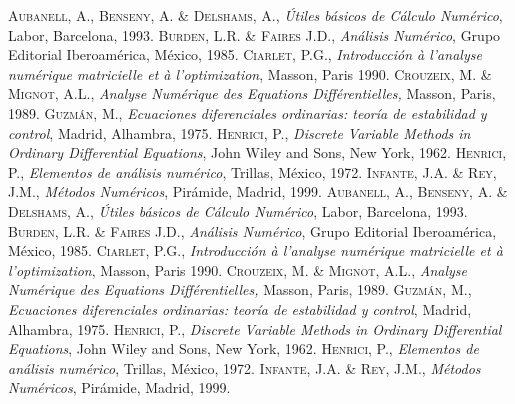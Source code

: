\documentclass[12pt,a4paper]{report}
\begin{document}
\begin{thebibliography}{9}
%
%
\textsc{Aubanell, A., Benseny, A. \& Delshams, A.,}
\textit{Útiles básicos de Cálculo Numérico}, Labor, Barcelona, 1993.
%
 \textsc{Burden, L.R. \& Faires J.D.,}
\textit{Análisis Numérico}, Grupo Editorial Iberoamérica, México, 1985.
%
 \textsc{Ciarlet, P.G.,}
\textit{Introducción à l'analyse numérique matricielle et à l'optimization},
Masson, Paris 1990.
%
\textsc{Crouzeix, M. \& Mignot, A.L.,}
\textit{Analyse Numérique des Equations Différentielles,} Masson, Paris, 1989.
\textsc{Guzmán, M.,}
\textit{Ecuaciones diferenciales ordinarias: teoría de estabilidad y control},
Madrid, Alhambra, 1975.
%
\textsc{Henrici, P.,}
\textit{Discrete Variable Methods in Ordinary Differential Equations},
John Wiley and Sons, New York, 1962.
%
 \textsc{Henrici, P.,}
\textit{Elementos de análisis numérico}, Trillas, México, 1972.
%
\textsc{Infante, J.A. \& Rey, J.M.,}
\textit{Métodos Numéricos}, Pirámide, Madrid, 1999.
%
\textsc{Aubanell, A., Benseny, A. \& Delshams, A.,}
\textit{Útiles básicos de Cálculo Numérico}, Labor, Barcelona, 1993.
%
 \textsc{Burden, L.R. \& Faires J.D.,}
\textit{Análisis Numérico}, Grupo Editorial Iberoamérica, México, 1985.
%
 \textsc{Ciarlet, P.G.,}
\textit{Introducción à l'analyse numérique matricielle et à l'optimization},
Masson, Paris 1990.
%
\textsc{Crouzeix, M. \& Mignot, A.L.,}
\textit{Analyse Numérique des Equations Différentielles,} Masson, Paris, 1989.
\textsc{Guzmán, M.,}
\textit{Ecuaciones diferenciales ordinarias: teoría de estabilidad y control},
Madrid, Alhambra, 1975.
%
\textsc{Henrici, P.,}
\textit{Discrete Variable Methods in Ordinary Differential Equations},
John Wiley and Sons, New York, 1962.
%
 \textsc{Henrici, P.,}
\textit{Elementos de análisis numérico}, Trillas, México, 1972.
%
\textsc{Infante, J.A. \& Rey, J.M.,}
\textit{Métodos Numéricos}, Pirámide, Madrid, 1999.
%
\end{thebibliography}





\listoffigures



\end{document}
